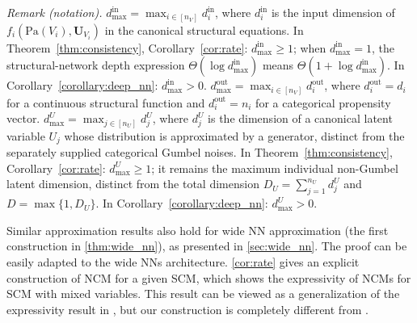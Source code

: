 \noindent\textit{Remark (notation).} $d_{\max}^{\text{in}}=\max_{i\in[n_V]}d_i^{\text{in}}$, where $d_i^{\text{in}}$ is the input dimension of $f_i(\text{Pa}(V_i),\boldsymbol{U}_{V_i})$ in the canonical structural equations. In Theorem~\ref{thm:consistency}, Corollary~\ref{cor:rate}: $d_{\max}^{\text{in}}\geqslant1$; when $d_{\max}^{\text{in}}=1$, the structural-network depth expression $\Theta(\log d_{\max}^{\text{in}})$ means $\Theta(1+\log d_{\max}^{\text{in}})$. In Corollary~\ref{corollary:deep_nn}: $d_{\max}^{\text{in}}>0$. $d_{\max}^{\text{out}}=\max_{i\in[n_V]}d_i^{\text{out}}$, where $d_i^{\text{out}}=d_i$ for a continuous structural function and $d_i^{\text{out}}=n_i$ for a categorical propensity vector. $d_{\max}^U=\max_{j\in[n_U]}d_j^U$, where $d_j^U$ is the dimension of a canonical latent variable $U_j$ whose distribution is approximated by a generator, distinct from the separately supplied categorical Gumbel noises. In Theorem~\ref{thm:consistency}, Corollary~\ref{cor:rate}: $d_{\max}^U\geqslant1$; it remains the maximum individual non-Gumbel latent dimension, distinct from the total dimension $D_U=\sum_{j=1}^{n_U}d_j^U$ and $D=\max\{1,D_U\}$. In Corollary~\ref{corollary:deep_nn}: $d_{\max}^U>0$.

 Similar approximation results also hold for wide NN approximation (the first construction in \cref{thm:wide_nn}), as presented in \cref{sec:wide_nn}. The proof can be easily adapted to the wide NNs architecture. \cref{cor:rate} gives an explicit construction of NCM for a given SCM, which shows the expressivity of NCMs for SCM with mixed variables. This result can be viewed as a generalization of the expressivity result in \cite{xia2022neural}, but our construction is completely different from \cite{xia2022neural}.
 
